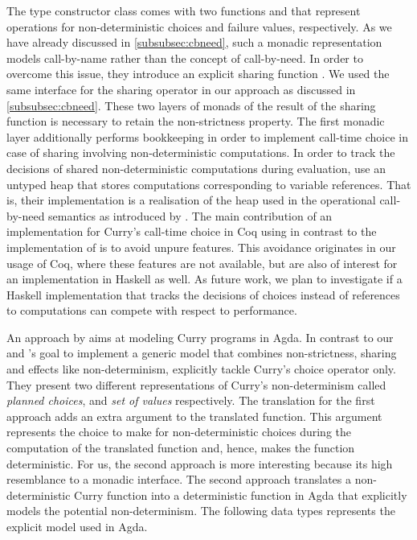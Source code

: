 The type constructor class  comes with two functions  and  that represent operations for non-deterministic choices and failure values, respectively.
As we have already discussed in \autoref{subsubsec:cbneed}, such a monadic representation models call-by-name rather than the  concept of call-by-need.
In order to overcome this issue, they introduce an explicit sharing function .
We used the same interface for the sharing operator in our approach as discussed in \autoref{subsubsec:cbneed}.
These two layers of monads of the result of the sharing function is necessary to retain the non-strictness property.
The first monadic layer additionally performs bookkeeping in order to implement call-time choice in case of sharing involving non-deterministic computations.
In order to track the decisions of shared non-deterministic computations during evaluation, \citeauthor{fischer2009purely} use an untyped heap that stores computations corresponding to variable references.
That is, their implementation is a realisation of the heap used in the operational call-by-need semantics as introduced by \citet{launchbury1993natural}.
The main contribution of an implementation for Curry's call-time choice in Coq using  in contrast to the implementation of \citeauthor{fischer2009purely} is to avoid unpure features.
This avoidance originates in our usage of Coq, where these features are not available, but are also of interest for an implementation in Haskell as well.
As future work, we plan to investigate if a Haskell implementation that tracks the decisions of choices instead of references to computations can compete with respect to performance.

An approach by \citet{antoy2017proving} aims at modeling Curry programs in Agda.
In contrast to our and \citeauthor{fischer2009purely}'s goal to implement a generic model that combines non-strictness, sharing and effects like non-determinism, \citeauthor{antoy2017proving} explicitly tackle Curry's choice operator only.
They present two different representations of Curry's non-determinism called \emph{planned choices}, and \emph{set of values} respectively.
The translation for the first approach adds an extra argument to the translated function.
This argument represents the choice to make for non-deterministic choices during the computation of the translated function and, hence, makes the function deterministic.
For us, the second approach is more interesting because its high resemblance to a monadic interface.
The second approach translates a non-deterministic Curry function into a deterministic function in Agda that explicitly models the potential non-determinism.
The following data types represents the explicit model used in Agda.

